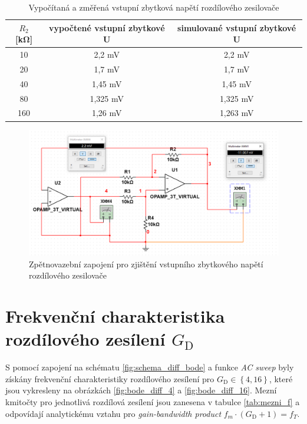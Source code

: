 \documentclass[twoside]{article}
\begin{document}
\begin{table}[h!]
    \centering
    \begin{tabular}{c|c|c}
        $R_2$ [\si{\kilo\ohm}] & vypočtené vstupní zbytkové U & simulované vstupní zbytkové U \\
        \hline
        10 & 2,2 \si{\milli\volt} & 2,2 \si{\milli\volt} \\
        20 & 1,7 \si{\milli\volt} & 1,7 \si{\milli\volt} \\
        40 & 1,45 \si{\milli\volt} & 1,45 \si{\milli\volt} \\
        80 & 1,325 \si{\milli\volt} & 1,325 \si{\milli\volt} \\
        160 & 1,26 \si{\milli\volt} & 1,263 \si{\milli\volt} \\
    \end{tabular}
    \caption{Vypočítaná a změřená vstupní zbytková napětí rozdílového zesilovače}
    \label{tab:vstupni_zbytkova_u}
\end{table}

\begin{figure}[h!]
    \centering
    \includegraphics[width=0.6\linewidth]{vstupni_zbytkove.png}
    \caption{Zpětnovazební zapojení pro zjištění vstupního zbytkového napětí rozdílového zesilovače}
    \label{fig:vstupni_zbytkove}
\end{figure}

\section{Frekvenční charakteristika rozdílového zesílení $G_\text{D}$}

S pomocí zapojení na schématu \ref{fig:schema_diff_bode} a funkce \textit{AC sweep} byly
získány frekvenční charakteristiky rozdílového zesílení pro $G_\text{D} \in \left\{4, 16\right\}$,
které jsou vykresleny na obrázkách \ref{fig:bode_diff_4} a \ref{fig:bode_diff_16}.
Mezní kmitočty pro jednotlivá rozdílová zesílení jsou zanesena v tabulce \ref{tab:mezni_f}
a odpovídají analytickému vztahu pro \textit{gain-bandwidth product} $f_m \cdot (G_\text{D} + 1) = f_T$.
\end{document}
